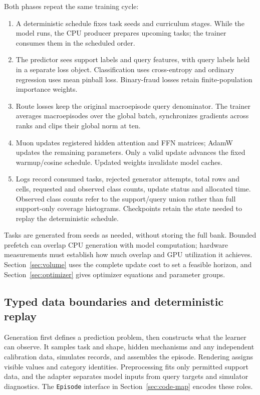 \documentclass[11pt]{article}
\begin{document}
Both phases repeat the same training cycle:
\begin{enumerate}
\item A deterministic schedule fixes task seeds and curriculum stages. While the model runs, the CPU producer prepares upcoming tasks; the trainer consumes them in the scheduled order.
\item The predictor sees support labels and query features, with query labels held in a separate loss object. Classification uses cross-entropy and ordinary regression uses mean pinball loss. Binary-fraud losses retain finite-population importance weights.
\item Route losses keep the original macroepisode query denominator. The trainer averages macroepisodes over the global batch, synchronizes gradients across ranks and clips their global norm at ten.
\item Muon updates registered hidden attention and FFN matrices; AdamW updates the remaining parameters. Only a valid update advances the fixed warmup/cosine schedule. Updated weights invalidate model caches.
\item Logs record consumed tasks, rejected generator attempts, total rows and cells, requested and observed class counts, update status and allocated time. Observed class counts refer to the support/query union rather than full support-only coverage histograms. Checkpoints retain the state needed to replay the deterministic schedule.
\end{enumerate}

Tasks are generated from seeds as needed, without storing the full bank. Bounded prefetch can overlap CPU generation with model computation; hardware measurements must establish how much overlap and GPU utilization it achieves. Section~\ref{sec:volume} uses the complete update cost to set a feasible horizon, and Section~\ref{sec:optimizer} gives optimizer equations and parameter groups.

\subsection{Typed data boundaries and deterministic replay}
\label{sec:training-contract}

Generation first defines a prediction problem, then constructs what the learner can observe. It samples task and shape, hidden mechanisms and any independent calibration data, simulates records, and assembles the episode. Rendering assigns visible values and category identities. Preprocessing fits only permitted support data, and the adapter separates model inputs from query targets and simulator diagnostics. The \texttt{Episode} interface in Section~\ref{sec:code-map} encodes these roles.
\end{document}
